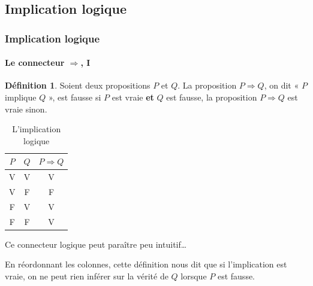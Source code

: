 \documentclass[10pt,notheorems]{beamer}
\theoremstyle{plain}
\theoremstyle{definition} %
\newtheorem{definition}{Définition}
\begin{document}
\subsection{Implication logique}

\begin{frame}
  \frametitle{Implication logique}
  \framesubtitle{Le connecteur $\Rightarrow$, I}

  \begin{definition}\label{def:implication}
    Soient deux propositions $P$ et $Q$. La proposition
    $P\Rightarrow Q$, on dit « $P$ implique $Q$ », est fausse si $P$
    est vraie \textbf{et} $Q$ est fausse, la proposition
    $P\Rightarrow Q$ est vraie sinon.
  \end{definition}


  \begin{table}[H]
    \centering
    \begin{tabular}[H]{|cc|c|}
      \hline
      $P$ & $Q$ & $P \Rightarrow Q$\\ \hline
      V & V & V \\
      V & F & F \\
      F & V & V \\
      F & F & V \\
      \hline\hline
    \end{tabular}
    \caption{L'implication logique}
    \label{tab:implication}
  \end{table}

  \bigskip

  Ce connecteur logique peut paraître peu intuitif\ldots\newline

  En réordonnant les colonnes, cette définition nous dit que si l'implication est vraie, on ne peut
  rien inférer sur la vérité de $Q$ lorsque $P$ est fausse.

  \clearpage
  
\end{frame}
\end{document}
